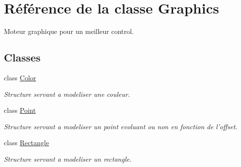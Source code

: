 \hypertarget{classGraphics}{\section{Référence de la classe Graphics}
\label{classGraphics}
}


Moteur graphique pour un meilleur control.  


\subsection*{Classes}
\begin{DoxyCompactItemize}
\item 
class \hyperlink{classGraphics_1_1Color}{Color}
\begin{DoxyCompactList}\small\item\em Structure servant a modeliser une couleur. \end{DoxyCompactList}\item 
class \hyperlink{classGraphics_1_1Point}{Point}
\begin{DoxyCompactList}\small\item\em Structure servant a modeliser un point evoluant ou non en fonction de l'offset. \end{DoxyCompactList}\item 
class \hyperlink{classGraphics_1_1Rectangle}{Rectangle}
\begin{DoxyCompactList}\small\item\em Structure servant a modeliser un rectangle. \end{DoxyCompactList}\end{DoxyCompactItemize}
